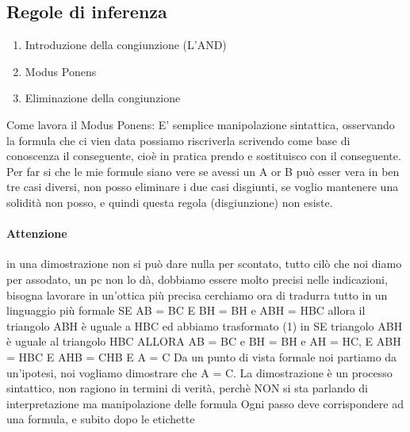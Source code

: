 \documentclass[12pt, a4paper, openany, oneside]{book}
\begin{document}
\subsection{Regole di inferenza}
\begin{enumerate}
	\item Introduzione della congiunzione (L'AND)
	\item Modus Ponens
	\item Eliminazione della congiunzione
\end{enumerate}
Come lavora il Modus Ponens: \newline
E' semplice manipolazione sintattica, osservando la formula che ci vien data
possiamo riscriverla scrivendo come base di conoscenza il conseguente, cioè in pratica prendo e sostituisco con il conseguente.
\newline \newline
Per far si che le mie formule siano vere se avessi un A or B può esser vera in 
ben tre casi diversi, non posso eliminare i due casi disgiunti, se voglio 
mantenere una solidità non posso, e quindi questa regola (disgiunzione) non 
esiste.
\paragraph{Attenzione} in una dimostrazione non si può dare nulla per 
scontato, tutto cilò che noi diamo per assodato, un pc non lo dà, dobbiamo 
essere molto precisi nelle indicazioni, bisogna lavorare in un'ottica più 
precisa
\newline \newline
cerchiamo ora di tradurra tutto in un linguaggio più formale
SE AB = BC E BH = BH e ABH = HBC allora il triangolo ABH è uguale a HBC 
ed abbiamo trasformato (1) in \newline \newline
SE triangolo ABH è uguale al triangolo HBC ALLORA AB = BC e BH = BH e AH = HC,
E ABH = HBC E AHB = CHB E A = C
\newline \newline
Da un punto di vista formale noi partiamo da un'ipotesi, noi vogliamo 
dimostrare che A = C.
\newline \newline
La dimostrazione è un processo sintattico, non ragiono in termini di verità, 
perchè NON si sta parlando di interpretazione ma manipolazione delle formula
\newline \newline
Ogni passo deve corrispondere ad una formula, e subito dopo le etichette
\end{document}
